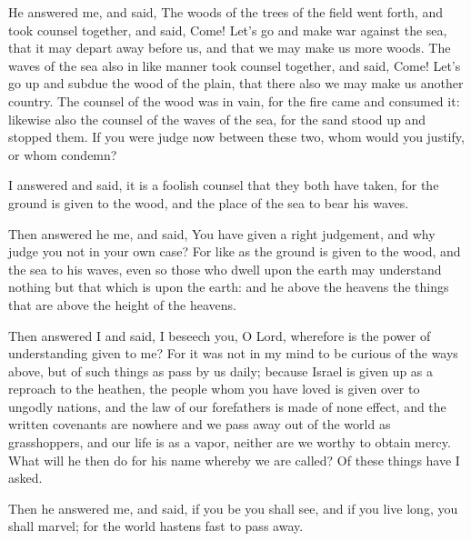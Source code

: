 {\par }{\PP {}He answered me, and said,
 The woods of the trees of the field went forth, and took counsel together,
and said, Come! Let’s go and make war against the sea, that it may depart away before us, and that we may make us more woods.
The waves of the sea also in like manner took counsel together, and said, Come! Let’s go up and subdue the wood of the plain, that there also we may make us another country.
The counsel of the wood was in vain, for the fire came and consumed it:
likewise also the counsel of the waves of the sea, for the sand stood up and stopped them.
If you were judge now between these two, whom would you justify, or whom condemn?
\par }{\PP {}I answered and said, it is a foolish counsel that they both have taken, for the ground is given to the wood, and the place of the sea
{} to bear his waves.
\par }{\PP {}Then answered he me, and said, You have given a right judgement, and why judge you not in your own case?
For like as the ground is given to the wood, and the sea to his waves, even so those who dwell upon the earth may understand nothing but that which is upon the earth: and he
{} above the heavens
{} the things that are above the height of the heavens.
\par }{\PP {}Then answered I and said, I beseech you, O Lord,
 wherefore is the power of understanding given to me?
For it was not in my mind to be curious of the ways above, but of such things as pass by us daily; because Israel is given up as a reproach to the heathen,
{} the people whom you have loved is given over to ungodly nations, and the law of our forefathers is made of none effect, and the written covenants are nowhere
{}
and we pass away out of the world as grasshoppers, and our life is as a
 vapor, neither are we worthy to obtain mercy.
What will he then do for his name whereby we are called? Of these things have I asked.
\par }{\PP {}Then he answered me, and said, if you be
{} you shall see, and if you live
 long, you shall marvel; for the world hastens fast to pass away.
}
